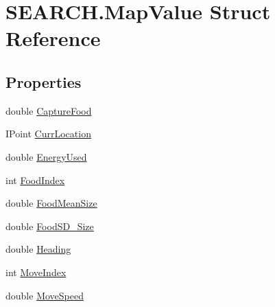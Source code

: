\hypertarget{struct_s_e_a_r_c_h_1_1_map_value}{\section{S\-E\-A\-R\-C\-H.\-Map\-Value Struct Reference}
\label{struct_s_e_a_r_c_h_1_1_map_value}
}
\subsection*{Properties}
\begin{DoxyCompactItemize}
\item 
double \hyperlink{struct_s_e_a_r_c_h_1_1_map_value_ac060f74c95e4074878b1bd9753c51e34}{Capture\-Food}
\item 
I\-Point \hyperlink{struct_s_e_a_r_c_h_1_1_map_value_ac4ffd2c74d29fb17d41494ecac314c47}{Curr\-Location}
\item 
double \hyperlink{struct_s_e_a_r_c_h_1_1_map_value_a517c6bbddd0e30a3c502ffffc3b34890}{Energy\-Used}
\item 
int \hyperlink{struct_s_e_a_r_c_h_1_1_map_value_a76ef37bdb2e01254a40d643d6c9db2db}{Food\-Index}
\item 
double \hyperlink{struct_s_e_a_r_c_h_1_1_map_value_a5da9e2d1378c114877a10bc2557a2d3d}{Food\-Mean\-Size}
\item 
double \hyperlink{struct_s_e_a_r_c_h_1_1_map_value_a359ccb8e3bc9586205c978f44097e0cb}{Food\-S\-D\-\_\-\-Size}
\item 
double \hyperlink{struct_s_e_a_r_c_h_1_1_map_value_a3a4afa7f6337324974e4755166c9f881}{Heading}
\item 
int \hyperlink{struct_s_e_a_r_c_h_1_1_map_value_a2d19e4193ddf809036e9057a619ee789}{Move\-Index}
\item 
double \hyperlink{struct_s_e_a_r_c_h_1_1_map_value_ac2b2fa609487c0a9c40145de61cc22e6}{Move\-Speed}

\end{DoxyCompactItemize}
